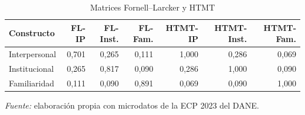 \begin{table}

\caption{\label{tab:discriminante}Matrices Fornell--Larcker y HTMT}
\centering
\begin{tabular}[t]{lrrrrrr}
\toprule
Constructo & FL-IP & FL-Inst. & FL-Fam. & HTMT-IP & HTMT-Inst. & HTMT-Fam.\\
\midrule
Interpersonal & 0,701 & 0,265 & 0,111 & 1,000 & 0,286 & 0,069\\
Institucional & 0,265 & 0,817 & 0,090 & 0,286 & 1,000 & 0,090\\
Familiaridad & 0,111 & 0,090 & 0,891 & 0,069 & 0,090 & 1,000\\
\bottomrule
\end{tabular}
\par\smallskip\noindent\parbox{\linewidth}{\footnotesize\textit{Fuente:} elaboración propia con microdatos de la ECP 2023 del DANE.}
\end{table}
